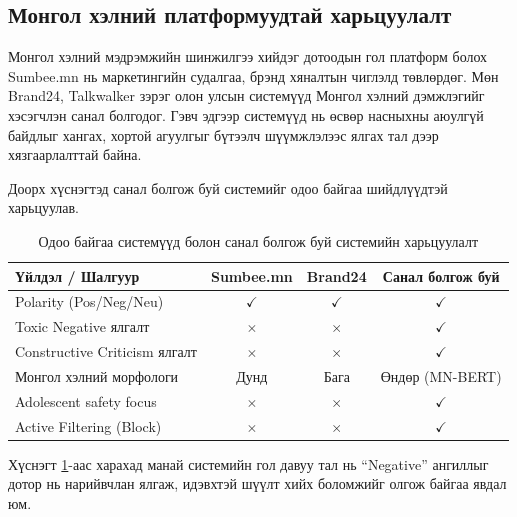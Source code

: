 \subsection{Монгол хэлний платформуудтай харьцуулалт}

Монгол хэлний мэдрэмжийн шинжилгээ хийдэг дотоодын гол платформ болох
Sumbee.mn нь маркетингийн судалгаа, брэнд хяналтын чиглэлд төвлөрдөг. Мөн
Brand24, Talkwalker зэрэг олон улсын системүүд Монгол хэлний дэмжлэгийг
хэсэгчлэн санал болгодог. Гэвч эдгээр системүүд нь өсвөр насныхны аюулгүй
байдлыг хангах, хортой агуулгыг бүтээлч шүүмжлэлээс ялгах тал дээр
хязгаарлалттай байна.

Доорх хүснэгтэд санал болгож буй системийг одоо байгаа шийдлүүдтэй харьцуулав.

\begin{table}[H]
    \centering
    \caption{Одоо байгаа системүүд болон санал болгож буй системийн харьцуулалт}
    \label{tab:system-comparison}
    \begin{tabular}{lccc}
        \toprule
        \textbf{Үйлдэл / Шалгуур} & \textbf{Sumbee.mn} & \textbf{Brand24} & \textbf{Санал болгож буй} \\
        \midrule
        Polarity (Pos/Neg/Neu) & $\checkmark$ & $\checkmark$ & $\checkmark$ \\
        Toxic Negative ялгалт & $\times$ & $\times$ & $\checkmark$ \\
        Constructive Criticism ялгалт & $\times$ & $\times$ & $\checkmark$ \\
        Монгол хэлний морфологи & Дунд & Бага & Өндөр (MN-BERT) \\
        Adolescent safety focus & $\times$ & $\times$ & $\checkmark$ \\
        Active Filtering (Block) & $\times$ & $\times$ & $\checkmark$ \\
        \bottomrule
    \end{tabular}
\end{table}

Хүснэгт \ref{tab:system-comparison}-аас харахад манай системийн гол давуу тал нь
``Negative'' ангиллыг дотор нь нарийвчлан ялгаж, идэвхтэй шүүлт хийх боломжийг
олгож байгаа явдал юм.


